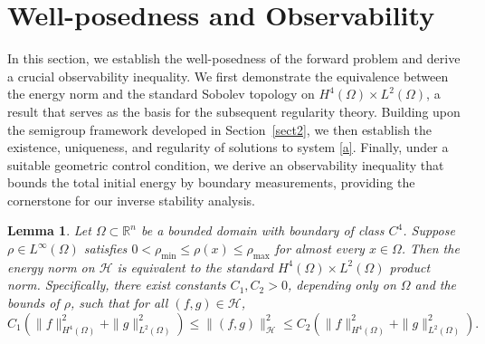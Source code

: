 \documentclass[12pt,reqno]{amsart}
\newtheorem{lemm}[theo]{Lemma}
\numberwithin{equation}{section}
\begin{document}
	\section{ Well-posedness and Observability }\label{sec3}
	
	In this section, we establish the well-posedness of the forward problem and derive a crucial observability inequality. We first demonstrate the equivalence between the energy norm and the standard Sobolev topology on $H^4(\Omega) \times L^2(\Omega)$, a result that serves as the basis for the subsequent regularity theory. Building upon the semigroup framework developed in Section~\ref{sect2}, we then establish the existence, uniqueness, and regularity of solutions to system \eqref{a}. Finally, under a suitable geometric control condition, we derive an observability inequality that bounds the total initial energy by boundary measurements, providing the cornerstone for our inverse stability analysis.
	
	\begin{lemm} \label{lemm3.1}
		Let $\Omega \subset \mathbb{R}^n$ be a bounded domain with boundary of class $C^4$. Suppose $\rho \in L^\infty(\Omega)$ satisfies $0 < \rho_{\min} \leq \rho(x) \leq \rho_{\max}$ for almost every $x \in \Omega$. Then the energy norm on $\mathcal{H}$ is equivalent to the standard $H^4(\Omega) \times L^2(\Omega)$ product norm. Specifically, there exist constants $C_1, C_2 > 0$, depending only on $\Omega$ and the bounds of $\rho$, such that for all $(f, g) \in \mathcal{H}$,
		\begin{equation*}\label{eq:norm_equivalence}
			C_1 \left( \|f\|_{H^4(\Omega)}^2 + \|g\|_{L^2(\Omega)}^2 \right) \leq \|(f, g)\|_{\mathcal{H}}^2 \leq C_2 \left( \|f\|_{H^4(\Omega)}^2 + \|g\|_{L^2(\Omega)}^2 \right).
		\end{equation*}
	\end{lemm}	
	
\end{document}
